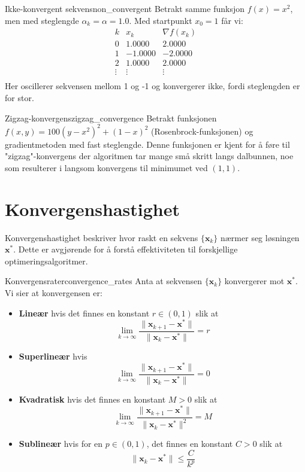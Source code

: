 \begin{example}{Ikke-konvergent sekvens}{non_convergent}
	Betrakt samme funksjon \(f(x) = x^2\), men med steglengde \(\alpha_k = \alpha = 1.0\). Med startpunkt \(x_0 = 1\) får vi:
	\[
		\begin{array}{l|l|l}
			k      & x_k     & \nabla f(x_k) \\
			\hline
			0      & 1.0000  & 2.0000        \\
			1      & -1.0000 & -2.0000       \\
			2      & 1.0000  & 2.0000        \\
			\vdots & \vdots  & \vdots        \\
		\end{array}
	\]
	Her oscillerer sekvensen mellom 1 og -1 og konvergerer ikke, fordi steglengden er for stor.
\end{example}

\begin{example}{Zigzag-konvergens}{zigzag_convergence}
	Betrakt funksjonen \(f(x, y) = 100(y - x^2)^2 + (1 - x)^2\) (Rosenbrock-funksjonen) og gradientmetoden med fast steglengde. Denne funksjonen er kjent for å føre til "zigzag"-konvergens der algoritmen tar mange små skritt langs dalbunnen, noe som resulterer i langsom konvergens til minimumet ved \((1, 1)\).
\end{example}

\section{Konvergenshastighet}
\label{sec:convergence_rates}

Konvergenshastighet beskriver hvor raskt en sekvens \(\{\symbf{x}_k\}\) nærmer seg løsningen \(\symbf{x}^\ast\). Dette er avgjørende for å forstå effektiviteten til forskjellige optimeringsalgoritmer.

\begin{definition}{Konvergensrater}{convergence_rates}
	Anta at sekvensen \(\{\symbf{x}_k\}\) konvergerer mot \(\symbf{x}^\ast\). Vi sier at konvergensen er:
	\begin{itemize}
		\item \textbf{Lineær} hvis det finnes en konstant \(r \in (0,1)\) slik at
		      \[
			      \lim_{k \to \infty} \frac{\|\symbf{x}_{k+1} - \symbf{x}^\ast\|}{\|\symbf{x}_k - \symbf{x}^\ast\|} = r
		      \]

		\item \textbf{Superlineær} hvis
		      \[
			      \lim_{k \to \infty} \frac{\|\symbf{x}_{k+1} - \symbf{x}^\ast\|}{\|\symbf{x}_k - \symbf{x}^\ast\|} = 0
		      \]

		\item \textbf{Kvadratisk} hvis det finnes en konstant \(M > 0\) slik at
		      \[
			      \lim_{k \to \infty} \frac{\|\symbf{x}_{k+1} - \symbf{x}^\ast\|}{\|\symbf{x}_k - \symbf{x}^\ast\|^2} = M
		      \]

		\item \textbf{Sublineær} hvis for en \(p \in (0,1)\), det finnes en konstant \(C > 0\) slik at
		      \[
			      \|\symbf{x}_{k} - \symbf{x}^\ast\| \leq \frac{C}{k^p}
		      \]
	\end{itemize}
\end{definition}

